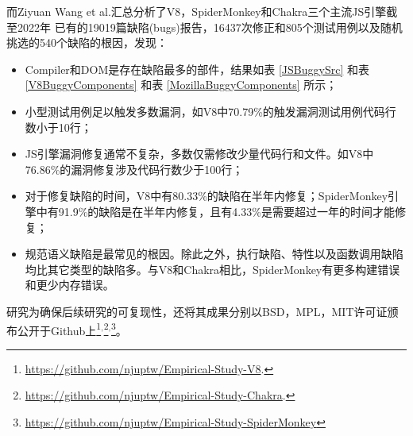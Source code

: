 		而Ziyuan Wang et al.\cite{JSEngineBugs}汇总分析了V8，SpiderMonkey和Chakra三个主流JS引擎截至2022年
		已有的19019篇缺陷(bugs)报告，16437次修正和805个测试用例以及随机挑选的540个缺陷的根因，发现：
		\begin{itemize}
			\item[(1)] Compiler和DOM是存在缺陷最多的部件，结果如表 \ref{JSBuggySrc} 和表 \ref{V8BuggyComponents} 和表 \ref{MozillaBuggyComponents} 所示；
			\item[(2)] 小型测试用例足以触发多数漏洞，如V8中70.79\%的触发漏洞测试用例代码行数小于10行；
			\item[(3)] JS引擎漏洞修复通常不复杂，多数仅需修改少量代码行和文件。如V8中76.86\%的漏洞修复涉及代码行数少于100行；
			\item[(4)] 对于修复缺陷的时间，V8中有80.33\%的缺陷在半年内修复；SpiderMonkey引擎中有91.9\%的缺陷是在半年内修复，且有4.33\%是需要超过一年的时间才能修复；
			\item[(5)] 规范语义缺陷是最常见的根因。除此之外，执行缺陷、特性以及函数调用缺陷均比其它类型的缺陷多。与V8和Chakra相比，SpiderMonkey有更多构建错误和更少内存错误。
		\end{itemize}

		研究为确保后续研究的可复现性，还将其成果分别以BSD，MPL，MIT许可证颁布公开于Github上\footnote{\url{https://github.com/njuptw/Empirical-Study-V8}.}${}^{,}$\footnote{\url{https://github.com/njuptw/Empirical-Study-Chakra}.}${}^{,}$\footnote{\url{https://github.com/njuptw/Empirical-Study-SpiderMonkey}}。

